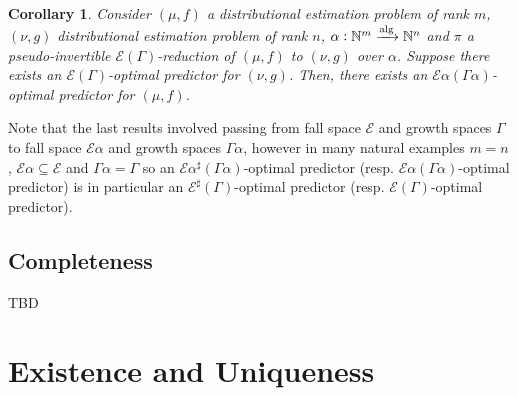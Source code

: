 \documentclass{article}
\numberwithin{equation}{section}
\theoremstyle{definition}
\theoremstyle{plain}
\newtheorem{corollary}{Corollary}[section]
\newcommand{\Nats}{\mathbb{N}}
\newcommand{\Fall}{\mathcal{E}}
\newcommand{\EG}{\Fall(\Gamma)}
\newcommand{\ESG}{\Fall^\sharp(\Gamma)}
\newcommand{\Alg}{\xrightarrow{\textnormal{alg}}}
\begin{document}
\begin{samepage}
\begin{corollary}

Consider $(\mu,f)$ a distributional estimation problem of rank ${m}$, $(\nu,g)$ distributional estimation problem of rank ${n}$, ${\alpha: \Nats^m \Alg \Nats^n}$ and $\pi$ a pseudo-invertible $\EG$-reduction of $(\mu, f)$ to $(\nu, g)$ over ${\alpha}$. Suppose there exists an $\EG$-optimal predictor for $(\nu, g)$. Then, there exists an $\Fall \alpha (\Gamma \alpha)$-optimal predictor for $(\mu, f)$.

\end{corollary}
\end{samepage}

Note that the last results involved passing from fall space ${\Fall}$ and growth spaces ${\Gamma}$ to fall space ${\Fall \alpha}$ and growth spaces ${\Gamma \alpha}$, however in many natural examples ${m = n}$, ${\Fall \alpha \subseteq \Fall}$ and ${\Gamma \alpha = \Gamma}$ so an ${\Fall \alpha^\sharp(\Gamma \alpha)}$-optimal predictor (resp. ${\Fall \alpha(\Gamma \alpha)}$-optimal predictor) is in particular an ${\ESG}$-optimal predictor (resp. ${\EG}$-optimal predictor).

\subsection{Completeness}

TBD

\section{Existence and Uniqueness}
\label{sec:e_and_u}

 
\end{document}
